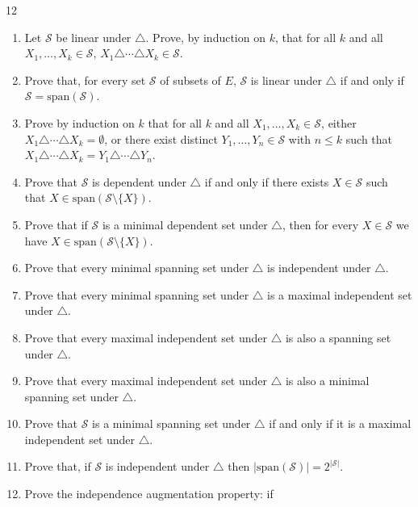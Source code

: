 \documentclass[11pt]{article}
\begin{document}
\begin{exercise}{12}
    \begin{enumerate}[label=(\alph*)]
        \item Let $\mathcal{S}$ be linear under $\triangle$. Prove, by
            induction on $k$, that for all $k$ and all $X_1,\dots,X_k
            \in \mathcal{S}$, $X_1 \triangle \cdots \triangle X_k \in
            \mathcal{S}$.
        \item Prove that, for every set $\mathcal{S}$ of subsets of
            $E$, $\mathcal{S}$ is linear under $\triangle$ if and only
            if $\mathcal{S} = \mathrm{span}(\mathcal{S})$.
        \item Prove by induction on $k$ that for all $k$ and all
            $X_1,\dots,X_k \in \mathcal{S}$, either
            $X_1\triangle\cdots\triangle X_k = \emptyset$, or there
            exist distinct $Y_1,\dots,Y_n \in \mathcal{S}$ with $n \le
            k$ such that $X_1\triangle\cdots\triangle X_k =
            Y_1\triangle\cdots\triangle Y_n$.
        \item Prove that $\mathcal{S}$ is dependent under $\triangle$
            if and only if there exists $X \in \mathcal{S}$ such that
            $X \in \mathrm{span}(\mathcal{S}\setminus\{X\})$.
        \item Prove that if $\mathcal{S}$ is a minimal dependent set
            under $\triangle$, then for every $X \in \mathcal{S}$ we
            have $X \in \mathrm{span}(\mathcal{S}\setminus\{X\})$.
        \item Prove that every minimal spanning set under $\triangle$
            is independent under $\triangle$.
        \item Prove that every minimal spanning set under $\triangle$
            is a maximal independent set under $\triangle$.
        \item Prove that every maximal independent set under
            $\triangle$ is also a spanning set under $\triangle$.
        \item Prove that every maximal independent set under
            $\triangle$ is also a minimal spanning set under
            $\triangle$.
        \item Prove that $\mathcal{S}$ is a minimal spanning set under
            $\triangle$ if and only if it is a maximal independent set
            under $\triangle$.
        \item Prove that, if $\mathcal{S}$ is independent under
            $\triangle$ then $|\mathrm{span}(\mathcal{S})| =
            2^{|\mathcal{S}|}$.
        \item Prove the independence augmentation property: if

\end{enumerate}
\end{exercise}
\end{document}

